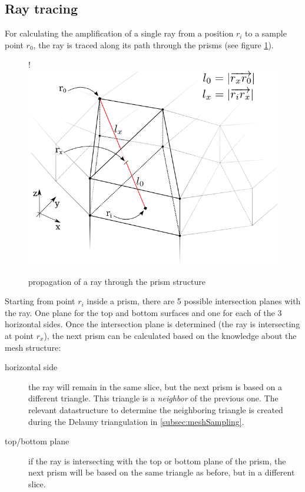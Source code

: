 \subsection{Ray tracing}
\label{subsec:raytracing}

For calculating the amplification of a single ray from a position $r_i$ to a sample
point $r_0$, the ray is traced along its path through the prisms (see figure
\ref{graphic:prism_propagation}). 

\begin{figure}[H]
  \centerline{
     {!} {\includegraphics{./graphics/prism_propagation_3.png}}
  }
  \caption{propagation of a ray through the prism structure}
  \label{graphic:prism_propagation}
\end{figure}

Starting from point $r_i$ inside a prism, there are 5 possible intersection
planes with the ray. One plane for the top and bottom surfaces and one for each
of the 3 horizontal sides. Once the intersection plane is determined (the ray is
intersecting at point $r_x$), the next prism can be calculated based on the
knowledge about the mesh structure:

\begin{description}

  \item[horizontal side]
    the ray will remain in the same slice, but the next prism is based on a
    different triangle. This triangle is a \emph{neighbor} of the previous one.
    The relevant datastructure to determine the neighboring triangle is created
    during the Delauny triangulation in \ref{subsec:meshSampling}.

  \item[top/bottom plane]
    if the ray is intersecting with the top or bottom plane of the prism, the
    next prism will be based on the same triangle as before, but in a different
    slice.

\end{description}


